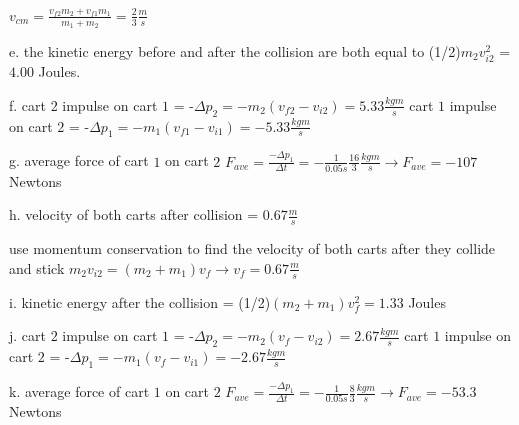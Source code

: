 $v_{cm} = \frac{v_{f2}m_{2} + v_{f1}m_{1}}{m_{1} + m_{2}} = \frac{2}{3} \frac{m}{s}$


e. the kinetic energy before and after the collision are both equal to
 (1/2)$m_{2}v_{i2}^{2}$ = $4.00$ Joules.


f. cart $2$ impulse on cart $1$ = -$\Delta p_{2} = -m_{2}(v_{f2} - v_{i2}) = 5.33 \frac{kg m}{s}$
cart $1$ impulse on cart $2$ = -$\Delta p_{1} = -m_{1}(v_{f1} - v_{i1}) = -5.33 \frac{kg m}{s}$


g. average force of cart $1$ on cart $2$ $F_{ave} = \frac{-\Delta p_{1}}{\Delta t} = 
-\frac{1}{0.05 s} \frac{16}{3} \frac{kg m}{s} \rightarrow F_{ave} = -107$ Newtons



h. velocity of both carts after collision = $0.67 \frac{m}{s}$

use momentum conservation to find the velocity of both carts after they collide and stick
$m_{2}v_{i2} = (m_{2} + m_{1})v_{f} \rightarrow v_{f} = 0.67 \frac{m}{s}$


i. kinetic energy after the collision = (1/2)$(m_{2} + m_{1})v_{f}^{2} = 1.33$ Joules



j. cart $2$ impulse on cart $1$ = -$\Delta p_{2} = -m_{2}(v_{f} - v_{i2}) = 2.67 \frac{kg m}{s}$
cart $1$ impulse on cart $2$ = -$\Delta p_{1} = -m_{1}(v_{f} - v_{i1}) = -2.67 \frac{kg m}{s}$



k. average force of cart $1$ on cart $2$ $F_{ave} = \frac{-\Delta p_{1}}{\Delta t} = 
-\frac{1}{0.05 s} \frac{8}{3} \frac{kg m}{s} \rightarrow F_{ave} = -53.3$ Newtons


